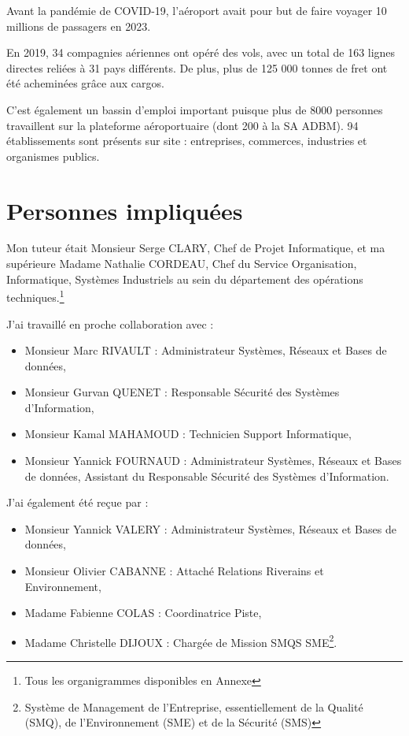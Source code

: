 Avant la pandémie de COVID-19, l'aéroport avait pour but de faire voyager 10 millions de passagers en 2023.

En 2019, 34 compagnies aériennes ont opéré des vols, avec un total de 163 lignes directes reliées à 31 pays différents.
De plus, plus de 125 000 tonnes de fret ont été acheminées grâce aux cargos.

C'est également un bassin d'emploi important puisque plus de 8000 personnes travaillent sur la plateforme aéroportuaire (dont 200 à la SA ADBM).
94 établissements sont présents sur site : entreprises, commerces, industries et organismes publics.

\section{Personnes impliquées}


Mon tuteur était Monsieur Serge CLARY, Chef de Projet Informatique, et ma supérieure Madame Nathalie CORDEAU, Chef du Service Organisation, Informatique, Systèmes Industriels au sein du département des opérations techniques.\footnote{Tous les organigrammes disponibles en Annexe}

J'ai travaillé en proche collaboration avec :

\begin{itemize}
    \item Monsieur Marc RIVAULT : Administrateur Systèmes, Réseaux et Bases de données,
    \item Monsieur Gurvan QUENET : Responsable Sécurité des Systèmes d'Information,
    \item Monsieur Kamal MAHAMOUD : Technicien Support Informatique,
    \item Monsieur Yannick FOURNAUD : Administrateur Systèmes, Réseaux et Bases de données, Assistant du Responsable Sécurité des Systèmes d'Information.\newline
\end{itemize}

J'ai également été reçue par :

\begin{itemize}
    \item Monsieur Yannick VALERY : Administrateur Systèmes, Réseaux et Bases de données,
    \item Monsieur Olivier CABANNE : Attaché Relations Riverains et Environnement,
    \item Madame Fabienne COLAS : Coordinatrice Piste,
    \item Madame Christelle DIJOUX : Chargée de Mission SMQS SME\footnote{Système de Management de l'Entreprise, essentiellement de la Qualité (SMQ), de l'Environnement (SME) et de la Sécurité (SMS)}.\newline
\end{itemize}


